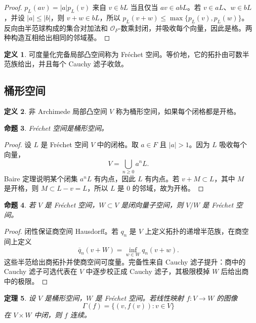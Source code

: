 \documentclass[11pt,a4paper,openany]{ctexbook}
\numberwithin{equation}{chapter}
\theoremstyle{plain}
\newtheorem{theorem}{定理}[chapter]
\newtheorem{proposition}[theorem]{命题}
\theoremstyle{definition}
\newtheorem{definition}[theorem]{定义}
\theoremstyle{remark}
\begin{document}
\begin{proof}
$p_L(av)=|a|p_L(v)$ 来自 $v\in bL$ 当且仅当 $av\in abL$。若 $v\in aL$、$w\in bL$，并设 $|a|\le |b|$，则 $v+w\in bL$，所以 $p_L(v+w)\le\max\{p_L(v),p_L(w)\}$。反向由半范球构成的集合对加法和 $\mathcal O_F$-数乘封闭，并吸收每个向量，因此是格。两种构造互相给出相同的邻域基。
\end{proof}

\begin{definition}
可度量化完备局部凸空间称为 Fréchet 空间。等价地，它的拓扑由可数半范族给出，并且每个 Cauchy 滤子收敛。
\end{definition}

\subsection{桶形空间}

\begin{definition}
非 Archimede 局部凸空间 $V$ 称为桶形空间，如果每个闭格都是开格。
\end{definition}

\begin{proposition}
Fréchet 空间是桶形空间。
\end{proposition}

\begin{proof}
设 $L$ 是 Fréchet 空间 $V$ 中的闭格。取 $a\in F$ 且 $|a|>1$。因为 $L$ 吸收每个向量，
\[
  V=\bigcup_{n\ge0}a^nL.
\]
Baire 定理说明某个闭集 $a^nL$ 有内点，因此 $L$ 有内点。若 $v+M\subset L$，其中 $M$ 是开格，则 $M\subset L-v=L$，所以 $L$ 是 $0$ 的邻域，故为开格。
\end{proof}

\begin{proposition}
若 $V$ 是 Fréchet 空间，$W\subset V$ 是闭向量子空间，则 $V/W$ 是 Fréchet 空间。
\end{proposition}

\begin{proof}
闭性保证商空间 Hausdorff。若 $q_n$ 是 $V$ 上定义拓扑的递增半范族，在商空间上定义
\[
  \overline q_n(v+W)=\inf_{w\in W}q_n(v+w).
\]
这些半范给出商拓扑并使商空间可度量。完备性来自 Cauchy 滤子提升：商中的 Cauchy 滤子可选代表在 $V$ 中逐步校正成 Cauchy 滤子，其极限模掉 $W$ 后给出商中的极限。
\end{proof}

\begin{theorem}
设 $V$ 是桶形空间，$W$ 是 Fréchet 空间。若线性映射 $f:V\to W$ 的图像
\[
  \Gamma(f)=\{(v,f(v)):v\in V\}
\]
在 $V\times W$ 中闭，则 $f$ 连续。
\end{theorem}
\end{document}
